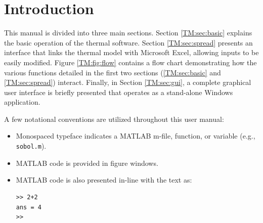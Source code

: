 \section{Introduction}
This manual is divided into three main sections.  Section \ref{TM:sec:basic} explains the basic operation of the thermal software.  Section \ref{TM:sec:spread} presents an interface that links the thermal model with Microsoft Excel, allowing inputs to be easily modified.  Figure \ref{TM:fig:flow} contains a flow chart demonstrating how the various functions detailed in the first two sections (\ref{TM:sec:basic} and \ref{TM:sec:spread}) interact. Finally, in Section \ref{TM:sec:gui}, a complete graphical user interface is briefly presented that operates as a stand-alone Windows application.

A few notational conventions are utilized throughout this user manual:
\begin{itemize}
\item Monospaced typeface indicates a MATLAB m-file, function, or variable (e.g., \texttt{sobol.m}).
\item MATLAB code is provided in figure windows.
\item MATLAB code is also presented in-line with the text as:
\begin{singlespaced}\begin{lstlisting}[style=inline]
>> 2+2
ans = 4 
>>
\end{lstlisting}\end{singlespaced}\vspace*{0pt}
\end{itemize}

